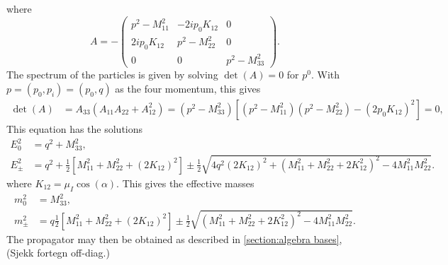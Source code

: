 \documentclass{article}
\begin{document}
where
\begin{equation*}
    A = -
    \begin{pmatrix}
        p^2 - M^2_{11}              & -2 i p_0 K_{12}   & 0             \\
        2 i p_0 K_{12}  & p^2 - M^2_{22}                & 0             \\
        0                           & 0                 & p^2 - M^2_{33}
    \end{pmatrix}.
\end{equation*}
The spectrum of the particles is given by solving $\det(A) = 0$ for $p^0$. With $p = (p_0, p_i) = (p_0, q)$ as the four momentum, this gives
\begin{align*}
    \det(A) & = A_{33} \left(A_{11} A_{22} + A_{12}^2\right)
    = \left(p^2 - M^2_{33}\right)
    \left[
        \left(p^2 - M^2_{11}\right)
        \left(p^2 - M^2_{22}\right)
        - \left(2 p_0 K_{12}\right)^2
    \right] = 0,
\end{align*}
This equation has the solutions
\begin{align}
    E_0^2 &= q^2 + M_{33}^2, \\
    E_\pm^2
    & = q^2 + \frac{1}{2} 
    \left[
        M_{11}^2 + M_{22}^2 + (2K_{12})^2 
    \right]
    \pm \frac{1}{2}
    \sqrt{
        4q^2\left(2K_{12}\right)^2 +
        \left(
            M_{11}^2 + M_{22}^2 + 2K_{12}^2
        \right)^2
        - 4 M_{11}^2 M_{22}^2
    }.
\end{align}
where $K_{12} = \mu_I \cos(\alpha)$. 
This gives the effective masses
\begin{align}
    m_0^2 &= M_{33}^2, \\
    m_\pm^2
    & = q\frac{1}{2} 
    \left[
        M_{11}^2 + M_{22}^2 + (2K_{12})^2 
    \right]
    \pm \frac{1}{2}
    \sqrt{
        \left(
            M_{11}^2 + M_{22}^2 + 2K_{12}^2
        \right)^2
        - 4 M_{11}^2 M_{22}^2
    }.
\end{align}
The propagator may then be obtained as described in \autoref{section:algebra bases}, (Sjekk fortegn off-diag.)
\end{document}
